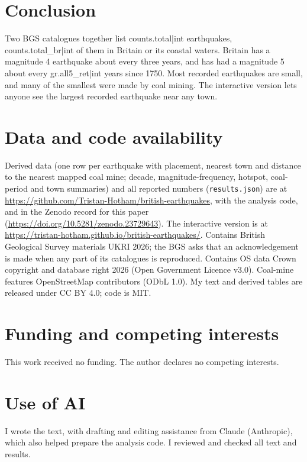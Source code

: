 \documentclass[11pt,a4paper]{article}
\begin{document}
\section{Conclusion}

Two BGS catalogues together list {{counts.total|int}} earthquakes, {{counts.total_br|int}} of them in Britain or its coastal waters. Britain has a magnitude 4 earthquake about every three years, and has had a magnitude 5 about every {{gr.all5_ret|int}} years since 1750. Most recorded earthquakes are small, and many of the smallest were made by coal mining. The interactive version lets anyone see the largest recorded earthquake near any town.



\section*{Data and code availability}

Derived data (one row per earthquake with placement, nearest town and distance to the nearest mapped coal mine; decade, magnitude-frequency, hotspot, coal-period and town summaries) and all reported numbers (\texttt{results.json}) are at \url{https://github.com/Tristan-Hotham/british-earthquakes}, with the analysis code, and in the Zenodo record for this paper (\url{https://doi.org/10.5281/zenodo.23729643}). The interactive version is at \url{https://tristan-hotham.github.io/british-earthquakes/}. Contains British Geological Survey materials \textcopyright{} UKRI 2026; the BGS asks that an acknowledgement is made when any part of its catalogues is reproduced. Contains OS data \textcopyright{} Crown copyright and database right 2026 (Open Government Licence v3.0). Coal-mine features \textcopyright{} OpenStreetMap contributors (ODbL 1.0). My text and derived tables are released under CC BY 4.0; code is MIT.

\section*{Funding and competing interests}

This work received no funding. The author declares no competing interests.

\section*{Use of AI}

I wrote the text, with drafting and editing assistance from Claude (Anthropic), which also helped prepare the analysis code. I reviewed and checked all text and results.
\end{document}

